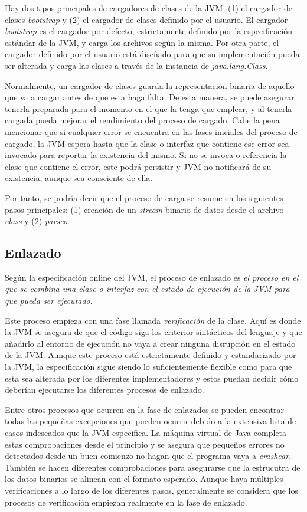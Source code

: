 \documentclass[english,runningheads,a4paper]{llncs}[2018/03/10]
\begin{document}
Hay dos tipos principales de cargadores de clases de la JVM: (1) el
cargador de clases \textit{bootstrap} y (2) el cargador de clases definido por
el usuario. El cargador \textit{bootstrap} es el cargador por defecto,
estrictamente definido por la especificación estándar de la JVM, y carga los
archivos según la misma. Por otra parte, el cargador definido por el usuario
está diseñado para que su implementación pueda ser alterada y carga las clases
a través de la instancia de \textit{java.lang.Class}.

Normalmente, un cargador de clases guarda la representación binaria de aquello
que va a cargar antes de que esta haga falta. De esta manera, se puede asegurar
tenerla preparada para el momento en el que la tenga que emplear, y al tenerla
cargada pueda mejorar el rendimiento del proceso de cargado. Cabe la pena
mencionar que si cualquier error se encuentra en las fases iniciales del proceso
de cargado, la JVM espera hasta que la clase o interfaz que contiene ese error
sea invocado para reportar la existencia del mismo. Si no se invoca o referencia
la clase que contiene el error, este podrá persistir y JVM no notificará de su
existencia, aunque sea consciente de ella.

Por tanto, se podría decir que el proceso de carga se resume en los siguientes
pasos principales: (1) creación de un \textit{stream} binario de datos desde el archivo
\textit{class} y (2) \textit{parseo}.

\subsection*{Enlazado}
Según la especificación online del JVM, el proceso de enlazado es \textit{el
proceso en el que se combina una clase o interfaz con el estado de ejecución de
la JVM para que pueda ser ejecutado}.

Este proceso empieza con una fase llamada \textit{verificación} de la clase.
Aquí es donde la JVM se asegura de que el código siga los criterior sintácticos
del lenguaje y que añadirlo al entorno de ejecución no vaya a crear ninguna
disrupción en el estado de la JVM. Aunque este proceso está estrictamente
definido y estandarizado por la JVM, la especificación sigue siendo lo
suficientemente flexible como para que esta sea alterada por los diferentes
implementadores y estos puedan decidir cómo deberían ejecutarse los diferentes
procesos de enlazado.

Entre otros procesos que ocurren en la fase de enlazados se pueden encontrar
todas las pequeñas excepciones que pueden ocurrir debido a la extensiva lista de
casos indeseados que la JVM especifica. La máquina virtual de Java completa
estas comprobaciones desde el principio y se asegura que pequeños errores no
detectados desde un buen comienzo no hagan que el programa vaya a
\textit{crashear}. También se hacen diferentes comprobaciones para asegurarse
que la estrucutra de los datos binarios se alinean con el formato esperado.
Aunque haya múltiples verificaciones a lo largo de los diferentes pasos,
generalmente se considera que los procesos de verificación empiezan realmente en
la fase de enlazado.
\end{document}
